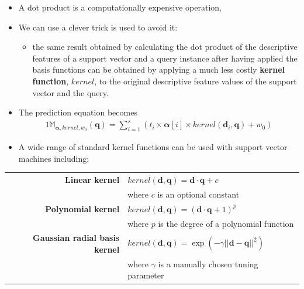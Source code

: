 \documentclass[xcolor={table}]{beamer}
\newcommand{\keyword}[1]{\alert{\textbf{#1}}\index{#1}}
\begin{document}
\begin{frame}
\begin{itemize}
\item A dot product is a  computationally expensive operation, 
\item We can use a clever trick is used to avoid it:
\begin{itemize}
	\item the same result obtained by calculating the dot product of the descriptive features of  a support vector and a query instance after having applied the basis functions can be obtained by applying a much less costly \keyword{kernel function}, $kernel$, to the original descriptive feature values of the support vector and the query. 
\end{itemize}
\end{itemize}
\end{frame} 

\begin{frame} 
\begin{itemize}
\item The prediction equation becomes
\begin{alignat}{1}
\mathbb{M}_{\pmb{\alpha}, kernel, w_0}(\mathbf{q}) = \displaystyle \sum_{i=1}^{s} \left(t_i\times\pmb{\alpha}[i]\times kernel\left(\mathbf{d}_i, \mathbf{q}\right) + w_0 \right) 
\label{eqn:svmPredictionEquationNonLinearKernel}
\end{alignat}
\item A wide range of standard kernel functions can be used with support vector machines including:
\end{itemize}
\begin{center}
{\renewcommand{\arraystretch}{1.2}\begin{tabular}{r p{5.5cm}}
\keyword{Linear kernel} & $kernel(\mathbf{d},\mathbf{q}) = \mathbf{d} \cdot \mathbf{q}+c$ \\
 & where $c$ is an optional constant \\
\keyword{Polynomial kernel} & $kernel(\mathbf{d}, \mathbf{q}) = \left(\mathbf{d}\cdot \mathbf{q} + 1\right)^p$ \\
 & where $p$ is the degree of a polynomial function \\
\keyword{Gaussian radial basis  kernel} & $kernel(\mathbf{d}, \mathbf{q}) =  \exp(-\gamma ||\mathbf{d} - \mathbf{q}||^2)$ \\
 & where  $\gamma$ is a manually chosen tuning parameter  \\
\end{tabular}}
\end{center}
\end{frame}

\begin{frame}
	\tableofcontents
\end{frame}
\end{document}
